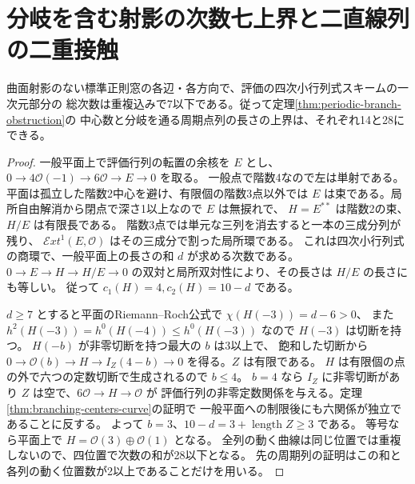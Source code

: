 \section{分岐を含む射影の次数七上界と二直線列の二重接触}
\label{sec:branch-degree-seven}
\begin{theorem}\label{thm:branch-degree-seven}
曲面射影のない標準正則窓の各辺・各方向で、評価の四次小行列式スキームの一次元部分の
総次数は重複込みで7以下である。従って定理\ref{thm:periodic-branch-obstruction}の
中心数と分岐を通る周期点列の長さの上界は、それぞれ14と28にできる。
\end{theorem}
\begin{proof}
一般平面上で評価行列の転置の余核を $E$ とし、
$0\to4\mathcal O(-1)\to6\mathcal O\to E\to0$ を取る。
一般点で階数4なので左は単射である。平面は孤立した階数2中心を避け、有限個の階数3点以外では
$E$ は束である。局所自由解消から閉点で深さ1以上なので $E$ は無捩れで、
$H=E^{**}$ は階数2の束、$H/E$ は有限長である。
階数3点では単元な三列を消去すると一本の三成分列が残り、
$\mathcal E xt^1(E,\mathcal O)$ はその三成分で割った局所環である。
これは四次小行列式の商環で、一般平面上の長さの和 $d$ が求める次数である。
$0\to E\to H\to H/E\to0$ の双対と局所双対性により、その長さは $H/E$ の長さにも等しい。
従って $c_1(H)=4,c_2(H)=10-d$ である。

$d\ge7$ とすると平面のRiemann--Roch公式で $\chi(H(-3))=d-6>0$、
また $h^2(H(-3))=h^0(H(-4))\le h^0(H(-3))$ なので $H(-3)$ は切断を持つ。
$H(-b)$ が非零切断を持つ最大の $b$ は3以上で、
飽和した切断から $0\to\mathcal O(b)\to H\to I_Z(4-b)\to0$ を得る。$Z$ は有限である。
$H$ は有限個の点の外で六つの定数切断で生成されるので $b\le4$。
$b=4$ なら $I_Z$ に非零切断があり $Z$ は空で、$6\mathcal O\to H\to\mathcal O$ が
評価行列の非零定数関係を与える。定理\ref{thm:branching-centers-curve}の証明で
一般平面への制限後にも六関係が独立であることに反する。
よって $b=3$、$10-d=3+\operatorname{length}Z\ge3$ である。
等号なら平面上で $H=\mathcal O(3)\oplus\mathcal O(1)$ となる。
全列の動く曲線は同じ位置では重複しないので、四位置で次数の和が28以下となる。
先の周期列の証明はこの和と各列の動く位置数が2以上であることだけを用いる。
\end{proof}

